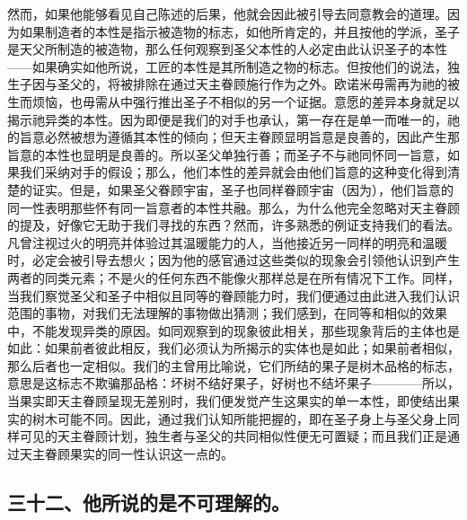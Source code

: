 然而，如果他能够看见自己陈述的后果，他就会因此被引导去同意教会的道理。因为如果制造者的本性是指示被造物的标志，如他所肯定的，并且按他的学派，圣子是天父所制造的被造物，那么任何观察到圣父本性的人必定由此认识圣子的本性——如果确实如他所说，工匠的本性是其所制造之物的标志。但按他们的说法，独生子因与圣父的，将被排除在通过天主眷顾施行作为之外。欧诺米毋需再为祂的被生而烦恼，也毋需从中强行推出圣子不相似的另一个证据。意愿的差异本身就足以揭示祂异类的本性。因为即便是我们的对手也承认，第一存在是单一而唯一的，祂的旨意必然被想为遵循其本性的倾向；但天主眷顾显明旨意是良善的，因此产生那旨意的本性也显明是良善的。所以圣父单独行善；而圣子不与祂同怀同一旨意，如果我们采纳对手的假设；那么，他们本性的差异就会由他们旨意的这种变化得到清楚的证实。但是，如果圣父眷顾宇宙，圣子也同样眷顾宇宙（因为），他们旨意的同一性表明那些怀有同一旨意者的本性共融。那么，为什么他完全忽略对天主眷顾的提及，好像它无助于我们寻找的东西？然而，许多熟悉的例证支持我们的看法。凡曾注视过火的明亮并体验过其温暖能力的人，当他接近另一同样的明亮和温暖时，必定会被引导去想火；因为他的感官通过这些类似的现象会引领他认识到产生两者的同类元素；不是火的任何东西不能像火那样总是在所有情况下工作。同样，当我们察觉圣父和圣子中相似且同等的眷顾能力时，我们便通过由此进入我们认识范围的事物，对我们无法理解的事物做出猜测；我们感到，在同等和相似的效果中，不能发现异类的原因。如同观察到的现象彼此相关，那些现象背后的主体也是如此：如果前者彼此相反，我们必须认为所揭示的实体也是如此；如果前者相似，那么后者也一定相似。我们的主曾用比喻说，它们所结的果子是树木品格的标志，意思是这标志不欺骗那品格：坏树不结好果子，好树也不结坏果子————所以，当果实即天主眷顾呈现无差别时，我们便发觉产生这果实的单一本性，即使结出果实的树木可能不同。因此，通过我们认知所能把握的，即在圣子身上与圣父身上同样可见的天主眷顾计划，独生者与圣父的共同相似性便无可置疑；而且我们正是通过天主眷顾果实的同一性认识这一点的。\par


\subsection{三十二、他所说的是不可理解的。}

